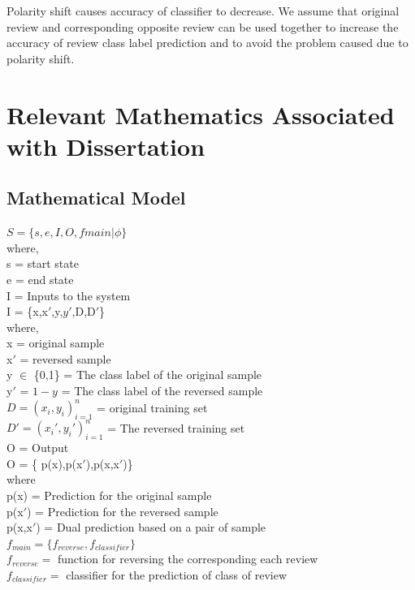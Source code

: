 \documentclass[oneside,a4paper,12pt]{pictreport}
\begin{document}
Polarity shift causes accuracy of classifier to decrease. We assume that 
original review and corresponding opposite review can be used together to increase the accuracy of 
review class label prediction and to avoid the problem caused due to polarity shift.

\section{Relevant Mathematics Associated with Dissertation}

\subsection{Mathematical Model}

$S=\{s,e,I,O,fmain|\phi\}$\\ 
where,\\
s = start state\\
e = end state\\
I = Inputs to the system\\
I = \{x,x${'}$,y,$y{'}$,D,D${'}$\}\\
where,\\
x = original sample\\
x${'}$ = reversed sample\\
y $\in$ \{0,1\} = The class label of the original sample\\
y${'}$ = \(1-y\) = The class label of the reversed sample\\
$
D = {(x_i,y_i )}_{i=1}^{n}$ = original training set\\
$ D{'}= {(x_i{'},y_i{'} )}_{i=1}^{n}$ = The reversed training set\\
O = Output \\
O = \{ p(x),p(x${'}$),p(x,x${'}$)\}\\
where\\
p(x) = Prediction for the original sample\\
p(x${'}$) = Prediction for the reversed sample\\
p(x,x${'}$) = Dual prediction based on a pair of sample\\
$f_{main} =\{f_{reverse},f_{classifier}\}$\\
$f_{reverse} =$ function for reversing the corresponding each review\\
$f_{classifier} =$ classifier for the prediction of class of review
\end{document}
